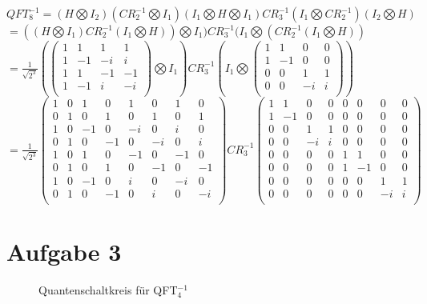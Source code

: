 \documentclass[a4paper]{scrartcl}
\begin{document}
\begin{enumerate}[a)]
$QFT_8^{-1}=(H\bigotimes I_2)(CR_2^{-1}\bigotimes I_1)(I_1\bigotimes H \bigotimes I_1)CR_3^{-1}(I_1 \bigotimes CR_2^{-1})(I_2 \bigotimes H)$\\
$=((H\bigotimes I_1)CR_2^{-1}(I_1\bigotimes H)) \bigotimes I_1)CR_3^{-1}(I_1 \bigotimes (CR_2^{-1}(I_1 \bigotimes H))$\\
$=\frac{1}{\sqrt{2^3}}(\begin{pmatrix} 1&1&1&1\\ 1&-1&-i&i\\ 1&1&-1&-1\\ 1&-1&i&-i\\\end{pmatrix} \bigotimes I_1) CR_3^{-1}(I_1 \bigotimes \begin{pmatrix}1&1&0&0\\ 1&-1&0&0\\ 0&0&1&1\\ 0&0&-i&i\\ \end{pmatrix})$\\
$=\frac{1}{\sqrt{2^3}}\begin{pmatrix}
1&0&1&0&1&0&1&0\\
0&1&0&1&0&1&0&1\\
1&0&-1&0&-i&0&i&0\\
0&1&0&-1&0&-i&0&i\\
1&0&1&0&-1&0&-1&0\\
0&1&0&1&0&-1&0&-1\\
1&0&-1&0&i&0&-i&0\\
0&1&0&-1&0&i&0&-i\\
\end{pmatrix}
CR_3^{-1}
\begin{pmatrix}
1&1&0&0&0&0&0&0\\
1&-1&0&0&0&0&0&0\\
0&0&1&1&0&0&0&0\\
0&0&-i&i&0&0&0&0\\
0&0&0&0&1&1&0&0\\
0&0&0&0&1&-1&0&0\\
0&0&0&0&0&0&1&1\\
0&0&0&0&0&0&-i&i\\
\end{pmatrix}$\\

\end{enumerate}

\newpage
\section*{Aufgabe 3}
\begin{figure}[htp] 
\caption{Quantenschaltkreis für QFT$_{4}^{-1}$}
\end{figure}
\end{document}
